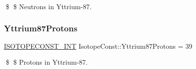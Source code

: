 \$ \$ Neutrons in Yttrium-\/87. \mbox{\label{group___isotope_const-_yttrium-_y87_gaa271591e1ea0447a5c086b34a7d5fe26}} 
\subsubsection{\texorpdfstring{Yttrium87\+Protons}{Yttrium87Protons}}
{\footnotesize\ttfamily \mbox{\hyperlink{group___isotope_const-_macros_ga5f18360b3e99483a35c32d789e62621c}{I\+S\+O\+T\+O\+P\+E\+C\+O\+N\+S\+T\+\_\+\+I\+NT}} Isotope\+Const\+::\+Yttrium87\+Protons = 39}

\$ \$ Protons in Yttrium-\/87. 